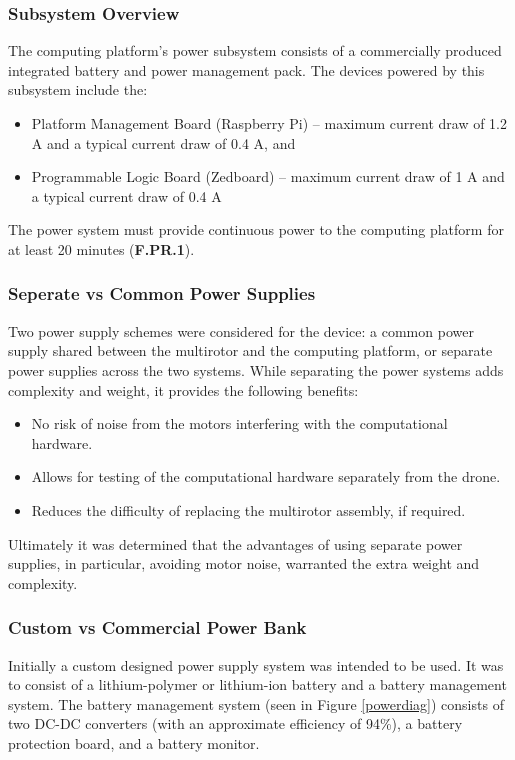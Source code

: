 \subsubsection{Subsystem Overview}
The computing platform's power subsystem consists of a commercially produced integrated battery and power management pack. The devices powered by this subsystem include the:

\begin{itemize}
\item Platform Management Board (Raspberry Pi) -- maximum current draw of 1.2 A and a typical current draw of 0.4 A, and
\item Programmable Logic Board (Zedboard) -- maximum current draw of 1 A and a typical current draw of 0.4 A
\end{itemize}

The power system must provide continuous power to the computing platform for at least 20 minutes (\textbf{F.PR.1}).

\subsubsection{Seperate vs Common Power Supplies}
Two power supply schemes were considered for the device: a common power supply shared between the multirotor and the computing platform, or separate power supplies across the two systems. While separating the power systems adds complexity and weight, it provides the following benefits:

\begin{itemize}
    \item No risk of noise from the motors interfering with the computational hardware.
    \item Allows for testing of the computational hardware separately from the drone.
    \item Reduces the difficulty of replacing the multirotor assembly, if required.
\end{itemize}

Ultimately it was determined that the advantages of using separate power supplies, in particular, avoiding motor noise, warranted the extra weight and complexity.

\subsubsection{Custom vs Commercial Power Bank}
Initially a custom designed power supply system was intended to be used. It was to consist of a lithium-polymer or lithium-ion battery and a battery management system. The battery management system (seen in Figure \ref{powerdiag}) consists of two DC-DC converters (with an approximate efficiency of 94\%), a battery protection board, and a battery monitor. 

